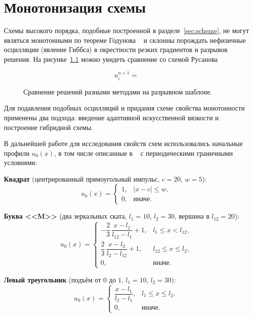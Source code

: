 \documentclass[14pt]{report}
\begin{document}
\chapter{Монотонизация схемы}
\textsc{\label{sec:monotonization}
}
Схемы высокого порядка, подобные построенной в разделе~\ref{sec:scheme}, не могут являться монотонными по теореме Годунова ~\cite{godunov1954} и склонны порождать нефизичные осцилляции (явление Гиббса) в окрестности резких градиентов и разрывов решения. На рисунке~\ref{fig:scheme-comparison-discontinuous} можно увидеть сравнение со схемой Русанова~\cite{rusanov1970}

\begin{dmath}
u_i^{n + 1} =

\end{dmath}


\begin{figure}[ht]
    \centering
    
    \caption{Сравнение решений разными методами на разрывном шаблоне.}
    \label{fig:scheme-comparison-discontinuous}
\end{figure}

Для подавления подобных осцилляций и придания схеме свойства монотонности применены два подхода: введение адаптивной искусственной вязкости и построение гибридной схемы.

В дальнейшей работе для исследования свойств схем использовались начальные профили $u_0(x)$, в том числе описанные в ~\cite{galanin1999} с периодическими граничными условиями:
    
\noindent\textbf{Квадрат} (центрированный прямоугольный импульс, $c=20$, $w=5$):
\[
u_0(x) = \begin{cases}
1, & |x-c| \le w,\\[2pt]
0, & \text{иначе}.
\end{cases}
\]

\noindent\textbf{Буква <<M>>} (два зеркальных ската, $l_1=10$, $l_2=30$, вершина в $l_{12}=20$):
\[
u_0(x) = \begin{cases}
-\dfrac{2}{3}\,\dfrac{x-l_1}{l_{12}-l_1}+1, & l_1 \le x < l_{12}, \\[8pt]
 \dfrac{2}{3}\,\dfrac{x-l_2}{l_2-l_{12}}+1,  & l_{12} \le x \le l_2,\\[8pt]
0, & \text{иначе}.
\end{cases}
\]

\noindent\textbf{Левый треугольник} (подъём от $0$ до $1$, $l_1=10$, $l_2=30$):
\[
u_0(x) = \begin{cases}
\dfrac{x-l_1}{l_2-l_1}, & l_1 \le x \le l_2,\\[6pt]
0, & \text{иначе}.
\end{cases}
\]
\end{document}
